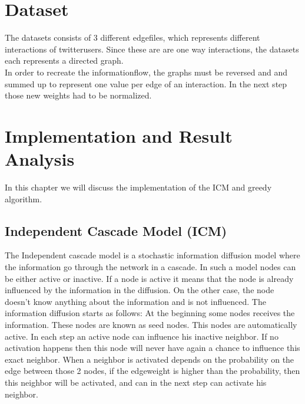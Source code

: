 

\section{Dataset}
The datasets consists of 3 different edgefiles, which represents different interactions of twitterusers. Since these are are one way interactions, the datasets each represents a directed graph.\\
 In order to recreate the informationflow, the graphs must be reversed and and summed up to represent one value per edge of an interaction. In the next step those new weights had to be normalized.
\section{Implementation and Result Analysis}
In this chapter we will discuss the implementation of the ICM and greedy algorithm.
\subsection{Independent Cascade Model (ICM)}
The Independent cascade model is a stochastic information diffusion model where the information go through the network in a cascade. In such a model nodes can be either active or inactive. If a node is active it means that the node is already influenced by the information in the diffusion. On the other case, the node doesn't know anything about the information and is not influenced.
The information diffusion starts as follows: At the beginning some nodes receives the information. These nodes are known as seed nodes. This nodes are automatically active. In each step an active node can influence his inactive neighbor. If no activation happens then this node will never have again a chance to influence this exact neighbor. When a neighbor is activated depends on the probability on the edge between those 2 nodes, if the edgeweight is higher than the probability, then this neighbor will be activated, and can in the next step can activate his neighbor.

